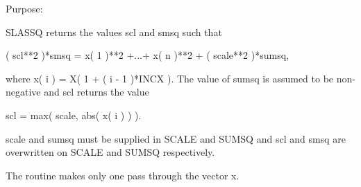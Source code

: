  \begin{DoxyParagraph}{Purpose\+: }
\begin{DoxyVerb} SLASSQ  returns the values  scl  and  smsq  such that

    ( scl**2 )*smsq = x( 1 )**2 +...+ x( n )**2 + ( scale**2 )*sumsq,

 where  x( i ) = X( 1 + ( i - 1 )*INCX ). The value of  sumsq  is
 assumed to be non-negative and  scl  returns the value

    scl = max( scale, abs( x( i ) ) ).

 scale and sumsq must be supplied in SCALE and SUMSQ and
 scl and smsq are overwritten on SCALE and SUMSQ respectively.

 The routine makes only one pass through the vector x.\end{DoxyVerb}
 
\end{DoxyParagraph}

